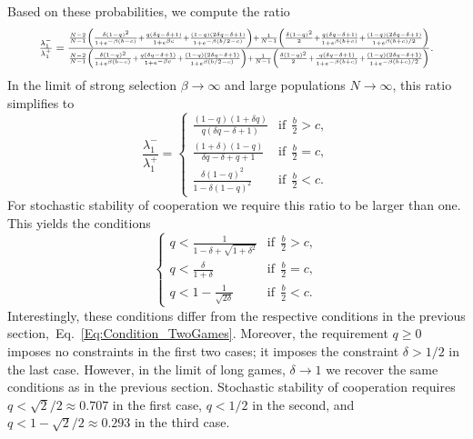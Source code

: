 \documentclass[11pt]{article}
\theoremstyle{plainCl1}
\theoremstyle{plainCl2}
\begin{document}
Based on these probabilities, we compute the ratio
\begin{equation}
  \resizebox{.9\textwidth}{!}
  {%
  $\frac{\lambda^{-}_1}{\lambda^{+}_1} =
  \frac{\frac{N - 2}{N-1} \left(\frac{\delta \left(1 - q\right)^{2}}{1 + e^{- \beta \left(b - c\right)}} + \frac{q \left(\delta q - \delta + 1\right)}{1+e^{\beta c} } + \frac{\left(1 - q\right) \left(2 \delta q - \delta + 1\right)}{1 + e^{- \beta \left(b/2- c\right)}}\right) + \frac{1}{N-1} \left(\frac{\delta \left(1 - q\right)^{2}}{2} + \frac{q \left(\delta q - \delta + 1\right)}{1 + e^{ \beta \left( b + c\right)}} + \frac{\left(1 - q\right) \left(2 \delta q - \delta + 1\right)}{1 + e^{\beta (b+c)/2}}\right)}
  {\frac{N - 2}{N-1} \left(\frac{\delta \left(1 - q\right)^{2}}{1 + e^{ \beta \left(b - c\right)}} + \frac{q \left(\delta q - \delta + 1\right)}{1 + e^{- \beta c}} + \frac{\left(1 - q\right) \left(2 \delta q - \delta + 1\right)}{1 + e^{ \beta \left(b/2-c\right)}}\right) + \frac{1}{N-1}\left(\frac{\delta \left(1 - q\right)^{2}}{2} + \frac{q \left(\delta q - \delta + 1\right)}{1 + e^{- \beta \left(b + c\right)}} + \frac{\left(1 - q\right) \left(2 \delta q - \delta + 1\right)}{1 + e^{- \beta (b+c)/2}}\right)}.
  $}
\end{equation}
In the limit of strong selection \(\beta \rightarrow \infty\) and large
populations \(N \rightarrow \infty \), this ratio simplifies to
\begin{equation}
\frac{\lambda^{-}_1}{\lambda^{+}_1} = 
\begin{cases}
  \frac{(1-q) (1+\delta q)}{q \left(\delta q - \delta + 1\right)}  &\text{if}~~\frac{b}{2} > c , \\[0.2cm]
  \frac{\left(1+\delta \right) \left(1-q\right)} {\delta q - \delta + q + 1} &\text{if}~~ \frac{b}{2} = c , \\[0.2cm]
  \frac{\delta (1-q)^{2}}{1-\delta(1-q)^2 } &\text{if}~~ \frac{b}{2} < c .
\end{cases}
\end{equation}
For stochastic stability of cooperation we require this ratio to be larger than one. This yields the conditions
\begin{equation} \label{Eq:Condition_TwoRounds}
\begin{cases}
  q<\frac{1}{1-\delta+\sqrt{1+\delta^2}}  &\text{if}~~\frac{b}{2} > c , \\[0.1cm]
  q<\frac{\delta} {1+\delta} &\text{if}~~ \frac{b}{2} = c , \\[0.1cm]
  q<1-\frac{1}{\sqrt{2\delta}} &\text{if}~~ \frac{b}{2} < c .
\end{cases}
\end{equation}
Interestingly, these conditions differ from the respective conditions in the previous section,~Eq.~\eqref{Eq:Condition_TwoGames}.
Moreover, the requirement $q\ge 0$ imposes no constraints in the first two cases; it imposes the constraint $\delta\!>\!1/2$ in the last case. 
However, in the limit of long games, $\delta\!\rightarrow \!1$ we recover the same conditions as in the previous section. Stochastic stability of cooperation requires $q\!<\!\sqrt{2}/2\!\approx\! 0.707$ in the first case, $q\!<\!1/2$ in the second, and $q<1\!-\!\sqrt{2}/2\approx 0.293$ in the third case. 
\end{document}
